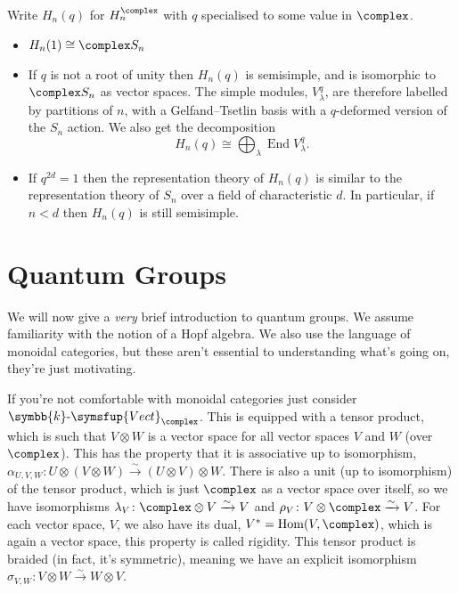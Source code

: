 \documentclass[fleqn]{NotesClass}
\makeatletter
\renewcommand{\field}{\symbb{k}}
\DeclareMathOperator{\End}{End}
\DeclareMathOperator{\Hom}{Hom}
\newcommand{\c@egory}[1]{\symsfup{#1}}
\newcommand{\Vect}[1][\field]{#1\text{-}\c@egory{Vect}}
\newcommand{\isomorphic}{\cong}
\makeatother
\begin{document}
    \begin{remark}{}{}
        Write \(H_n(q)\) for \(H_n^{\complex}\) with \(q\) specialised to some value in \(\complex\).
        \begin{itemize}
            \item \(H_n(1) \isomorphic \complex S_n\)
            \item If \(q\) is not a root of unity then \(H_n(q)\) is semisimple, and is isomorphic to \(\complex S_n\) as vector spaces.
            The simple modules, \(V_\lambda^q\), are therefore labelled by partitions of \(n\), with a Gelfand--Tsetlin basis with a \(q\)-deformed version of the \(S_n\) action.
            We also get the decomposition
            \begin{equation}
                H_n(q) \isomorphic \bigoplus_\lambda \End V_\lambda^q.
            \end{equation}
            \item If \(q^{2d} = 1\) then the representation theory of \(H_n(q)\) is similar to the representation theory of \(S_n\) over a field of characteristic \(d\).
            In particular, if \(n < d\) then \(H_n(q)\) is still semisimple.
        \end{itemize}
    \end{remark}
    
    \chapter{Quantum Groups}
    We will now give a \emph{very} brief introduction to quantum groups.
    We assume familiarity with the notion of a Hopf algebra.
    We also use the language of monoidal categories, but these aren't essential to understanding what's going on, they're just motivating.
    
    If you're not comfortable with monoidal categories just consider \(\Vect_{\complex}\).
    This is equipped with a tensor product, which is such that \(V \otimes W\) is a vector space for all vector spaces \(V\) and \(W\) (over \(\complex\)).
    This has the property that it is associative up to isomorphism, \(\alpha_{U,V,W} \colon U \otimes (V \otimes W) \xrightarrow{\sim} (U \otimes V) \otimes W\).
    There is also a unit (up to isomorphism) of the tensor product, which is just \(\complex\) as a vector space over itself, so we have isomorphisms \(\lambda_V \colon \complex \otimes V \xrightarrow{\sim} V\) and \(\rho_V \colon V \otimes \complex \xrightarrow{\sim} V\).
    For each vector space, \(V\), we also have its dual, \(V^* = \Hom(V, \complex)\), which is again a vector space, this property is called rigidity.
    This tensor product is braided (in fact, it's symmetric), meaning we have an explicit isomorphism \(\sigma_{V,W} \colon V \otimes W \xrightarrow{\sim} W \otimes V\).
    
\end{document}
